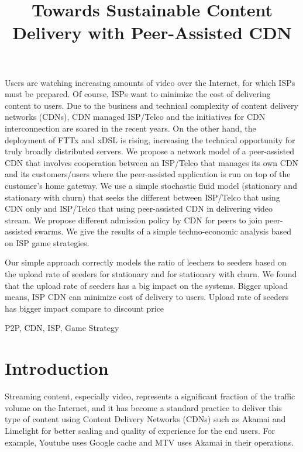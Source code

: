\documentclass[paper]{ieice}
\title{Towards Sustainable Content Delivery with Peer-Assisted CDN}
\begin{document}
\maketitle

\begin{summary}
  Users are watching increasing amounts of video over the Internet,
  for which ISPs must be prepared.  Of course, ISPs want to minimize
  the cost of delivering content to users.  Due to the business and
  technical complexity of content delivery networks (CDNs), CDN
  managed ISP/Telco and the initiatives for CDN interconnection are
  soared in the recent years.  On the other hand, the deployment of
  FTTx and xDSL is rising, increasing the technical opportunity for
  truly broadly distributed servers.  We propose a network model of a
  peer-assisted CDN that involves cooperation between an ISP/Telco
  that manages its own CDN and its customers/users where the
  peer-assisted application is run on top of the customer's home
  gateway.  We use a simple stochastic fluid model (stationary and
  stationary with churn) that seeks the different between ISP/Telco
  that using CDN only and ISP/Telco that using peer-assisted CDN in
  delivering video stream. We propose different admission policy by
  CDN for peers to join peer-assisted swarms.  We give the results of
  a simple techno-economic analysis based on ISP game strategies.

  Our simple approach correctly models the ratio of leechers to
  seeders based on the upload rate of seeders for stationary and for
  stationary with churn.  We found that the upload rate of seeders has
  a big impact on the systems.  Bigger upload means, ISP CDN can
  minimize cost of delivery to users.  Upload rate of seeders has
  bigger impact compare to discount price


\end{summary}
\begin{keywords}
P2P, CDN, ISP, Game Strategy
\end{keywords}  

\section{Introduction}\label{intro}

Streaming content, especially video, represents a significant fraction
of the traffic volume on the Internet, and it has become a standard
practice to deliver this type of content using Content Delivery
Networks (CDNs) such as Akamai and Limelight for better scaling and
quality of experience for the end users.  For example, Youtube uses
Google cache and MTV uses Akamai in their operations.
\end{document}
